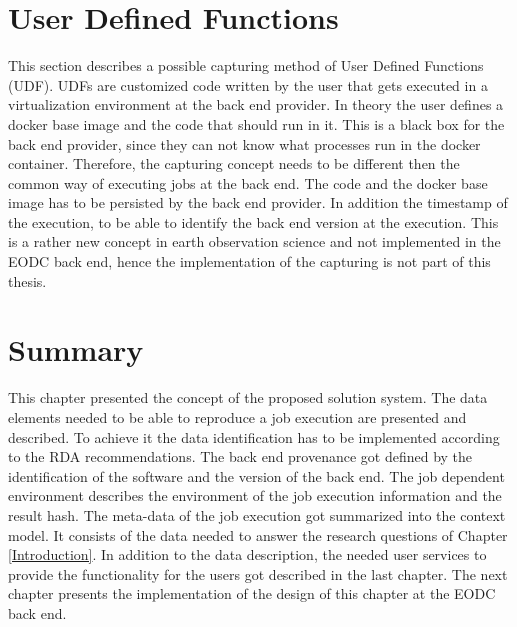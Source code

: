 \documentclass[draft,final]{vutinfth} %
\begin{document}
\section{User Defined Functions}\label{Design:User Defined Functions}
This section describes a possible capturing method of User Defined Functions (UDF). UDFs are customized code written by the user that gets executed in a virtualization environment at the back end provider. In theory the user defines a docker base image and the code that should run in it. This is a black box for the back end provider, since they can not know what processes run in the docker container. Therefore, the capturing concept needs to be different then the common way of executing jobs at the back end. The code and the docker base image has to be persisted by the back end provider. In addition the timestamp of the execution, to be able to identify the back end version at the execution. This is a rather new concept in earth observation science and not implemented in the EODC back end, hence the implementation of the capturing is not part of this thesis.

\section{Summary}
This chapter presented the concept of the proposed solution system. The data elements needed to be able to reproduce a job execution are presented and described. To achieve it the data identification has to be implemented according to the RDA recommendations. The back end provenance got defined by the identification of the software and the version of the back end. The job dependent environment describes the environment of the job execution information and the result hash. The meta-data of the job execution got summarized into the context model. It consists of the data needed to answer the research questions of Chapter \ref{Introduction}. In addition to the data description, the needed user services to provide the functionality for the users got described in the last chapter. The next chapter presents the implementation of the design of this chapter at the EODC back end.     
\end{document}
